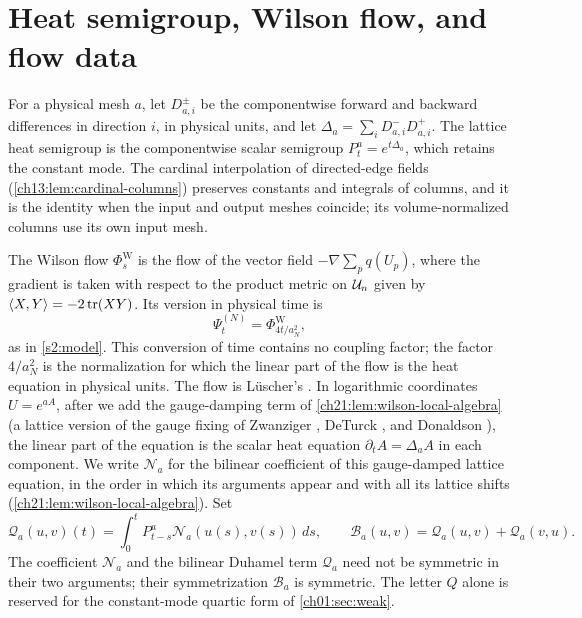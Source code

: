 \section{Heat semigroup, Wilson flow, and flow data}\label{ch01:sec:flow}

For a physical mesh $a$, let $D_{a,i}^\pm$ be the componentwise forward and backward differences in direction $i$, in physical units, and let $\Delta_a=\sum_iD_{a,i}^-D_{a,i}^+$. The lattice heat semigroup is the componentwise scalar semigroup $P_t^a=e^{t\Delta_a}$, which retains the constant mode. The cardinal interpolation of directed-edge fields (\cref{ch13:lem:cardinal-columns}) preserves constants and integrals of columns, and it is the identity when the input and output meshes coincide; its volume-normalized columns use its own input mesh.

The Wilson flow $\Phi^{\mathrm W}_s$ is the flow of the vector field $-\nabla\sum_pq(U_p)$, where the gradient is taken with respect to the product metric on $\mathcal U_{n}$ given by $\langle X,Y\rangle=-2\operatorname{tr}(XY)$. Its version in physical time is
\[
 \Psi_t^{(N)}=\Phi^{\mathrm W}_{4t/a_N^2},
\]
as in \cref{s2:model}. This conversion of time contains no coupling factor; the factor $4/a_N^2$ is the normalization for which the linear part of the flow is the heat equation in physical units. The flow is Lüscher's \cite{Luscher2010WilsonFlow}. In logarithmic coordinates $U=e^{aA}$, after we add the gauge-damping term of \cref{ch21:lem:wilson-local-algebra} (a lattice version of the gauge fixing of Zwanziger \cite{Zwanziger1981}, DeTurck \cite{DeTurck1983}, and Donaldson \cite{Donaldson1985}), the linear part of the equation is the scalar heat equation $\partial_tA=\Delta_aA$ in each component. We write $\mathcal N_a$ for the bilinear coefficient of this gauge-damped lattice equation, in the order in which its arguments appear and with all its lattice shifts (\cref{ch21:lem:wilson-local-algebra}). Set
\[
 \mathcal Q_a(u,v)(t)=\int_0^tP_{t-s}^a\mathcal N_a(u(s),v(s))\,ds,
 \qquad\mathcal B_a(u,v)=\mathcal Q_a(u,v)+\mathcal Q_a(v,u).
\]
The coefficient $\mathcal N_a$ and the bilinear Duhamel term $\mathcal Q_a$ need not be symmetric in their two arguments; their symmetrization $\mathcal B_a$ is symmetric. The letter $Q$ alone is reserved for the constant-mode quartic form of \cref{ch01:sec:weak}.

